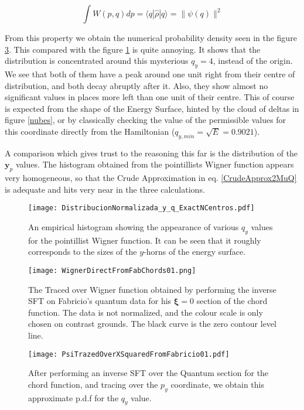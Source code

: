 \documentclass[a4paper,12pt]{article}
\newcommand{\yfase}{\mathbf{y}}
\newcommand{\xifase}{ {\boldsymbol{\xi}} }
\newcommand{\bra}[1]{\langle #1|}
\newcommand{\ket}[1]{|#1\rangle}
\begin{document}
\begin{equation}
\int W(p,q) d p = \bra{q}\hat{\rho}\ket{q} = \| \psi (q) \|^2
\end{equation}

From this property we obtain the numerical probability density 
seen in the figure \ref{FabProb}. This compared with the figure \ref{histoqy}
is quite annoying. It shows that the distribution is concentrated around this
mysterious $q_y=4$, instead of the origin. We see that both of them have a peak around
one unit right from their centre of distribution, and both decay abruptly after it.
Also, they show almost no significant values in places more left than 
one unit of their centre. This of course is expected from the shape of the
Energy Surface, hinted by the cloud of deltas in figure \ref{nubes}, or
by classically checking the value of the permissible values for this coordinate
directly from the Hamiltonian ($q_{y,min}=\sqrt{E}=0.9021$). 

A comparison which gives trust to the reasoning this far is
the distribution of the $\yfase_p$ values. The histogram obtained
from the pointillists Wigner function appears very homogeneous, so
that the Crude Approximation in eq. \ref{CrudeApprox2MuQ} is adequate
and hits very near in the three calculations.

\begin{figure}[h]
  \centering     
    \texttt{[image: DistribucionNormalizada\_y\_q\_ExactNCentros.pdf]}
  \caption{An empirical histogram showing the appearance of various $q_y$ values
for the pointillist Wigner function. It can be seen that it roughly corresponds
to the sizes of the $y$-horns of the energy surface.}
  \label{histoqy}
\end{figure}


\begin{figure}[h]
  \centering     
    \texttt{[image: WignerDirectFromFabChords01.png]}
  \caption{The Traced over Wigner function obtained by performing the inverse
SFT on Fabricio's quantum data for his $\xifase=0$ section of the chord function.
The data is not normalized, and the colour scale is only chosen on contrast grounds.
The black curve is the zero contour level line. }
  \label{WignerFromFab}
\end{figure}


\begin{figure}[h]
  \centering     
    \texttt{[image: PsiTrazedOverXSquaredFromFabricio01.pdf]}
    \caption{After performing an inverse SFT over the Quantum section for the chord function,
and tracing over the $p_y$ coordinate, we obtain this approximate p.d.f for the $q_y$
value.}
    \label{FabProb}
\end{figure}
\end{document}
